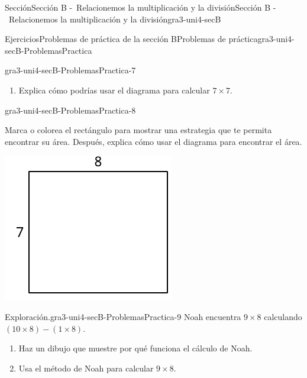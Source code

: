 \documentclass[twoside,10pt,]{article}
\begin{document}
\begin{sectionptx}{Sección}{Sección B -~Relacionemos la multiplicación y la división}{}{Sección B -~Relacionemos la multiplicación y la división}{}{}{gra3-uni4-secB}
\begin{exercises-subsection}{Ejercicios}{Problemas de práctica de la sección B}{}{Problemas de práctica}{}{}{gra3-uni4-secB-ProblemasPractica}
\begin{divisionexercise}{5}{}{}{gra3-uni4-secB-ProblemasPractica-7}
\begin{enumerate}[label={(\alph*)}]
\begin{image}{0}{1}{0}{}
\end{image}%
\item{}Explica cómo podrías usar el diagrama para calcular \(7\times 7\).%
\end{enumerate}
\end{divisionexercise}%
\begin{divisionexercise}{6}{}{}{gra3-uni4-secB-ProblemasPractica-8}%
\begin{sidebyside}{2}{0}{0}{0}%
\begin{sbspanel}{0.6}%
Marca o colorea el rectángulo para mostrar una estrategia que te permita encontrar su área. Después, explica cómo usar el diagrama para encontrar el área.%
\end{sbspanel}%
\begin{sbspanel}{0.4}%
\includegraphics[width=\linewidth]{external/svg-source/tikz-file-159147-scale13.pdf}
\end{sbspanel}%
\end{sidebyside}%
\end{divisionexercise}%
\begin{divisionexercise}{7}{Exploración.}{}{gra3-uni4-secB-ProblemasPractica-9}%
Noah encuentra \(9 \times 8\) calculando \((10 \times 8) - (1 \times 8)\).%
%
\begin{enumerate}[label={(\alph*)}]
\item{}Haz un dibujo que muestre por qué funciona el cálculo de Noah.%
\item{}Usa el método de Noah para calcular \(9\times 8\).%

\end{enumerate}
\end{divisionexercise}
\end{exercises-subsection}
\end{sectionptx}
\end{document}
